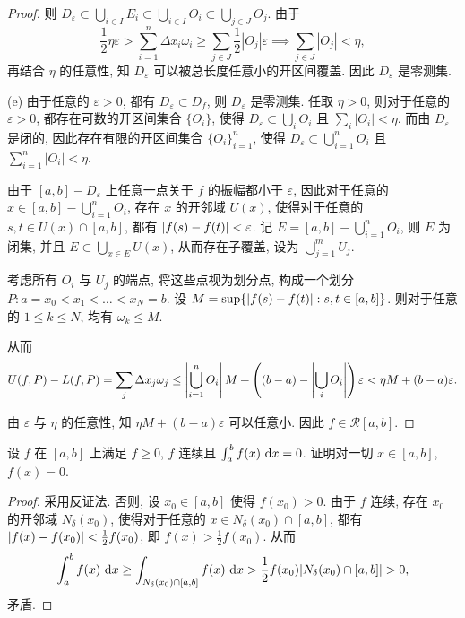 \documentclass{article}
\begin{document}
\begin{proof}
  则 \( D_\varepsilon \subset \bigcup_{i\in I} E_i \subset \bigcup_{i\in I} O_i\subset \bigcup_{j\in J} O_j \). 由于
  \[ \frac{1}{2}\eta \varepsilon>\sum_{i=1}^{n}\Delta x_i \omega_i\ge \sum_{j\in J} \frac{1}{2}|O_j|\varepsilon
  \implies \sum_{j\in J}^{}|O_j| < \eta, \]
  再结合 \( \eta \) 的任意性, 知 \( D_\varepsilon \) 可以被总长度任意小的开区间覆盖. 因此 \( D_\varepsilon \) 是零测集.

  (e) 由于任意的 \( \varepsilon>0 \), 都有 \( D_\varepsilon\subset D_f \), 则 \( D_\varepsilon \) 是零测集. 任取 \( \eta>0 \), 则对于任意的 \( \varepsilon>0 \), 都存在可数的开区间集合 \( \{O_i\} \), 使得 \( D_\varepsilon\subset \bigcup_i O_i \) 且 \( \sum_i |O_i|<\eta \). 而由 \( D_\varepsilon \) 是闭的, 因此存在有限的开区间集合 \( \{O_i\}_{i=1}^n \), 使得 \( D_\varepsilon\subset \bigcup_{i=1}^n O_i \) 且 \( \sum_{i=1}^n |O_i|<\eta \). 

  由于 \( [a,b]- D_\varepsilon \) 上任意一点关于 \( f \) 的振幅都小于 \( \varepsilon \), 因此对于任意的 \( x\in [a,b]-\bigcup_{i=1}^n O_i \), 存在 \( x \) 的开邻域 \( U(x) \), 使得对于任意的 \( s,t\in U(x)\cap[a,b] \), 都有 \( \left|f(s)-f(t)\right|<\varepsilon \). 记 \( E= [a,b]-\bigcup_{i=1}^n O_i \), 则 \( E \) 为闭集, 并且 \( E\subset\bigcup_{x\in E}U(x) \), 从而存在子覆盖, 设为 \( \bigcup_{j=1}^{m}U_j \). 

  考虑所有 \( O_i \) 与 \( U_j \) 的端点, 将这些点视为划分点, 构成一个划分 \( P:a=x_0<x_1<\dots<x_N=b \). 设 \( M=\sup\{\left|f(s)-f(t)\right|:s,t\in[a,b]\} \). 则对于任意的 \( 1\le k\le N \), 均有 \( \omega_k\le M \). 
  
  从而
 \[ U(f,P)-L(f,P) = \sum_{j}\Delta x_j \omega_j 
 \le \left|\bigcup_{i=1}^{n}O_i\right|M + \left( (b-a)-\left|\bigcup_i O_i\right| \right)\varepsilon
 <\eta M+(b-a)\varepsilon. \]

 由 \( \varepsilon \) 与 \( \eta \) 的任意性, 知 \( \eta M+(b-a)\varepsilon \) 可以任意小. 因此 \( f \in \mathcal{R}[a,b] \).
\end{proof}



\begin{problem}
设 $f$ 在 $[a,b]$ 上满足 $f \ge 0$, $f$ 连续且 $\int_a^b f(x)\,\,\mathrm{d} x = 0$. 证明对一切 $x \in [a,b]$, $f(x)=0$.
\end{problem}

\begin{proof}
  采用反证法. 否则, 设 \( x_0\in [a,b] \) 使得 \( f(x_0)>0 \). 由于 \( f \) 连续, 存在 \( x_0 \) 的开邻域 \( N_\delta(x_0) \), 使得对于任意的 \( x\in N_\delta(x_0)\cap[a,b] \), 都有 \( \left|f(x)-f(x_0)\right|<\frac{1}{2}f(x_0) \), 即 \( f(x)>\frac{1}{2}f(x_0) \). 从而
  \[ \int_a^b f(x)\,\d x \ge \int_{N_\delta(x_0)\cap[a,b]} f(x)\,\d x > \frac{1}{2}f(x_0)|N_\delta(x_0)\cap[a,b]|>0, \]
  矛盾.
\end{proof}
\end{document}
